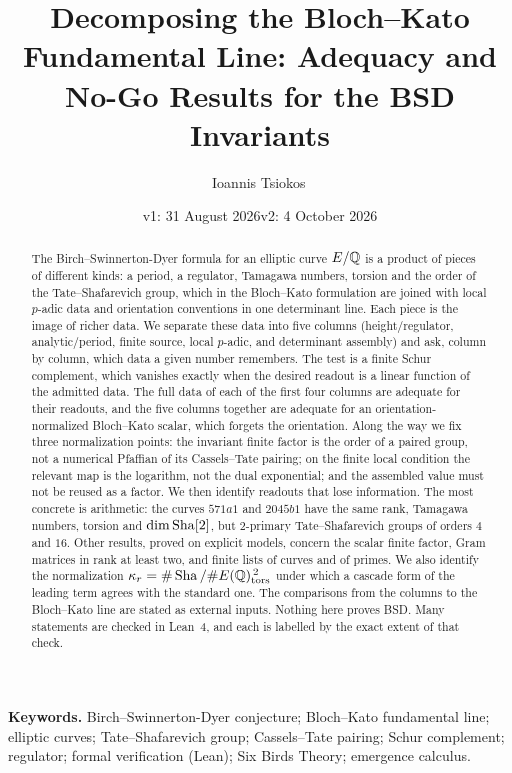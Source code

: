 \documentclass[11pt]{article}
\title{Decomposing the Bloch--Kato Fundamental Line: Adequacy and No-Go
Results for the BSD Invariants}
\author{Ioannis Tsiokos\,\orcidlink{0009-0009-7659-5964}}
\date{v1: 31 August 2026\quad\textperiodcentered\quad v2: 4 October 2026}
\theoremstyle{definition}
\begin{document}
\maketitle
\thispagestyle{firstpage}

\begin{abstract}
The Birch--Swinnerton-Dyer formula for an elliptic curve $E/\mathbb{Q}$ is a
product of pieces of different kinds: a period, a regulator, Tamagawa
numbers, torsion and the order of the Tate--Shafarevich group, which in
the Bloch--Kato formulation are joined with local $p$-adic data and
orientation conventions in one determinant line.  Each piece is the image
of richer data.  We separate these data into five columns
(height/regulator, analytic/period, finite source, local $p$-adic, and
determinant assembly) and ask, column by column, which data a given
number remembers.  The test is a finite Schur complement, which vanishes
exactly when the desired readout is a linear function of the admitted
data.  The full data of each of the first four columns are adequate for
their readouts, and the five columns together are adequate for an
orientation-normalized Bloch--Kato scalar, which forgets the orientation.
Along the way we fix three normalization points: the invariant finite
factor is the order of a paired group, not a numerical Pfaffian of its
Cassels--Tate pairing; on the finite local condition the relevant map is
the logarithm, not the dual exponential; and the assembled value must not
be reused as a factor.  We then identify readouts that lose information.
The most concrete is arithmetic: the curves $571a1$ and $2045b1$ have the
same rank, Tamagawa numbers, torsion and $\dim\operatorname{Sha}[2]$, but $2$-primary
Tate--Shafarevich groups of orders $4$ and $16$.  Other results, proved on
explicit models, concern the scalar finite factor, Gram matrices in rank
at least two, and finite lists of curves and of primes.  We also identify
the normalization $\kappa_r=\#\operatorname{Sha}/\#E(\mathbb{Q})_{\operatorname{tors}}^{\,2}$ under which a
cascade form of the leading term agrees with the standard one.  The
comparisons from the columns to the Bloch--Kato line are stated as
external inputs.  Nothing here proves BSD.  Many statements are checked
in Lean~4, and each is labelled by the exact extent of that check.
\end{abstract}

\medskip
\noindent\textbf{Keywords.} Birch--Swinnerton-Dyer conjecture; Bloch--Kato fundamental line; elliptic curves; Tate--Shafarevich group; Cassels--Tate pairing; Schur complement; regulator; formal verification (Lean); Six Birds Theory; emergence calculus.
\end{document}
